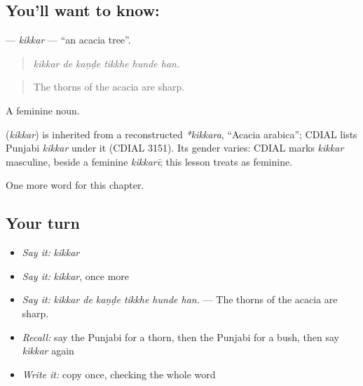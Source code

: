 \subsection*{You'll want to know: }
\textbf{} — \emph{kikkar} — \textquotedblleft{}an acacia tree\textquotedblright{}.

\begin{quote}
     
\end{quote}

\begin{quote}
\emph{kikkar de kaṇḍe tikkhe hunde han.}
\end{quote}

\begin{quote}
The thorns of the acacia are sharp.
\end{quote}

A feminine noun.

\begin{cousinweb}
\textbf{} (\emph{kikkar}) is inherited from a reconstructed \emph{*kikkara}, \textquotedblleft{}Acacia arabica\textquotedblright{}; CDIAL lists Punjabi \emph{kikkar} under it (CDIAL 3151). Its gender varies: CDIAL marks \emph{kikkar} masculine, beside a feminine \emph{kikkarī}; this lesson treats  as feminine.
\end{cousinweb}

\begin{grammarlens}[title={What you've built}]
One more word for this chapter.
\end{grammarlens}

\subsection*{Your turn}
\begin{itemize}
\raggedright
  \item \emph{Say it:} \emph{kikkar}
  \item \emph{Say it:} \emph{kikkar}, once more
  \item \emph{Say it:} \emph{kikkar de kaṇḍe tikkhe hunde han.} — The thorns of the acacia are sharp.
  \item \emph{Recall:} say the Punjabi for a thorn, then the Punjabi for a bush, then say \emph{kikkar} again
  \item \emph{Write it:} copy \textbf{} once, checking the whole word
\end{itemize}

